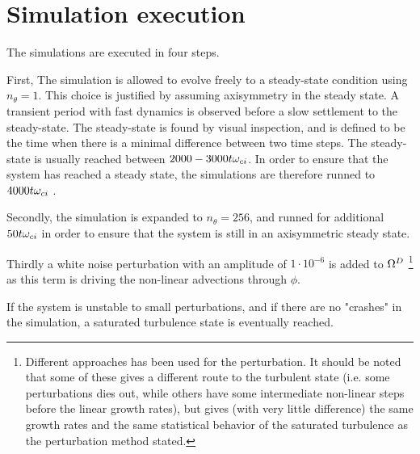 \section{Simulation execution}
\label{sec:execution}
%
The simulations are executed in four steps.

First, The simulation is allowed to evolve freely to a steady-state condition using $n_\theta = 1$.
This choice is justified by assuming axisymmetry in the steady state.
A transient period with fast dynamics is observed before a slow settlement to the steady-state.
The steady-state is found by visual inspection, and is defined to be the time when there is a minimal difference between two time steps.
The steady-state is usually reached between $2000-3000t\omega_{ci}$.
In order to ensure that the system has reached a steady state, the simulations are therefore runned to $4000t\omega_{ci}$ .

Secondly, the simulation is expanded to $n_\theta = 256$, and runned for additional $50t\omega_{ci}$ in order to ensure that the system is still in an axisymmetric steady state.

Thirdly a white noise perturbation with an amplitude of $1\cdot10^{-6}$ is added to $\Omega^D$%
\footnote{Different approaches has been used for the perturbation.
    It should be noted that some of these gives a different route to the turbulent state (i.e. some perturbations dies out, while others have some intermediate non-linear steps before the linear growth rates), but gives (with very little difference) the same growth rates and the same statistical behavior of the saturated turbulence as the perturbation method stated.}
%
as this term is driving the non-linear advections through $\phi$.

If the system is unstable to small perturbations, and if there are no "crashes" in the simulation, a saturated turbulence state is eventually reached.

